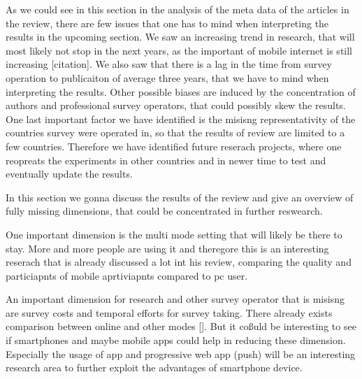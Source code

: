 As we could see in this section in the analysis of the meta data of the articles in the review, there are few issues that one has to mind when interpreting the results in the upcoming section. We saw an increasing trend in research, that will most likely not stop in the next years, as the important of mobile internet is still increasing [citation]. We also saw that there is a lag in the time from survey operation to publicaiton of average three years, that we have to mind when interpreting the results. Other possible biases are induced by the concentration of authors and professional survey operators, that could possibly skew the results. One last important factor we have identified is the misisng representativity of the countries survey were operated in, so that the results of review are limited to a few countries. Therefore we have identified future reserach projects, where one reopreats the experiments in other countries and in newer time to test and eventually update the results. 


In this section we gonna discuss the results of the review and give an overview of fully missing dimensions, that could be concentrated in further reswearch.

One important dimension is the  multi mode setting that will likely be there to stay. More and more people are using it and theregore this is an interesting reserach that is already discussed a lot int his review, comparing the quality and particiapnts of mobile aprtiviapnts compared to pc user.

An important dimension for research and other survey operator that is misisng are survey costs and temporal efforts for survey taking. There already exists comparison between online and other modes []. But it coßuld be interesting to see if smartphones and maybe mobile apps could help in reducing these dimension. Especially the usage of app and progressive web app (push) will be an interesting research area to further exploit the advantages of smartphone device. 






